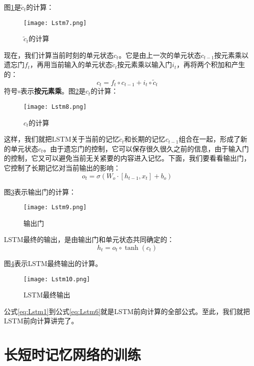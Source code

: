 图\ref{fig:Lstm7}是\({\tilde{c}}_t\)的计算：
\begin{figure}[!h]
	\centering
	\texttt{[image: Lstm7.png]}
	\caption{\({\tilde{c}}_t\)的计算}
	\label{fig:Lstm7}
\end{figure}
现在，我们计算当前时刻的单元状态\({c}_t\)。它是由上一次的单元状态\({c}_{t-1}\)按元素乘以遗忘门\(f_t\)，再用当前输入的单元状态\({\tilde{c}}_t\)按元素乘以输入门\(i_t\)，再将两个积加和产生的：
\begin{equation}
	\label{eq:Lstm4}
	{c}_t=f_t\circ{{c}_{t-1}}+i_t\circ{{\tilde{c}}_t}
\end{equation}
符号\(\circ\)表示\textbf{按元素乘}。图\ref{fig:Lstm8}是\({c}_t\)的计算：

\begin{figure}[!h]
	\centering
	\texttt{[image: Lstm8.png]}
	\caption{\({c}_t\)的计算}
	\label{fig:Lstm8}
\end{figure}

这样，我们就把LSTM关于当前的记忆\({\tilde{c}}_t\)和长期的记忆\({c}_{t-1}\)组合在一起，形成了新的单元状态\({c}_t\)。由于遗忘门的控制，它可以保存很久很久之前的信息，由于输入门的控制，它又可以避免当前无关紧要的内容进入记忆。下面，我们要看看输出门，它控制了长期记忆对当前输出的影响：
\begin{equation}
	\label{eq:Lstm5}
	{o}_t=\sigma(W_o\cdot[{h}_{t-1},{x}_t]+{b}_o)
\end{equation}

图\ref{fig:Lstm9}表示输出门的计算：

\begin{figure}[!h]
	\centering
	\texttt{[image: Lstm9.png]}
	\caption{输出门}
	\label{fig:Lstm9}
\end{figure}

LSTM最终的输出，是由输出门和单元状态共同确定的：
\begin{equation}
	\label{eq:Lstm6}
	{h}_t={o}_t\circ \tanh({c}_t)
\end{equation}

图\ref{fig:Lstm10}表示LSTM最终输出的计算。

\begin{figure}[!h]
	\centering
	\texttt{[image: Lstm10.png]}
	\caption{LSTM最终输出}
	\label{fig:Lstm10}
\end{figure}

公式\ref{eq:Lstm1}到公式\ref{eq:Lstm6}就是LSTM前向计算的全部公式。至此，我们就把LSTM前向计算讲完了。

\section{长短时记忆网络的训练}\label{Lstm:3}


